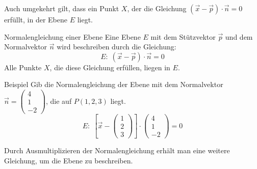 \documentclass{article}
\begin{document}
Auch umgekehrt gilt, dass ein Punkt $X$, der die Gleichung $\displaystyle \left(\vec{x} - \vec{p}\right)\cdot \vec{n} = 0$
erfüllt, in der Ebene $E$ liegt.
\begin{boxx}[Red]{Normalengleichung einer Ebene}
    Eine Ebene $E$ mit dem Stützvektor $\vec{p}$ und dem Normalvektor $\vec{n}$ wird beschreiben durch die Gleichung:
    \[E:\; \left(\vec{x} - \vec{p}\right)\cdot \vec{n} = 0\]
    Alle Punkte $X$, die diese Gleichung erfüllen, liegen in $E$.
\end{boxx}
\begin{boxx}[DarkBlue]{Beispiel}
    Gib die Normalengleichung der Ebene mit dem Normalvektor $\displaystyle \vec{n} = \begin{pmatrix}4\\1\\-2\end{pmatrix}$,
    die auf $P(1,2,3)$ liegt.
    \[E:\; \left[\vec{x} - \begin{pmatrix}1\\2\\3\end{pmatrix}\right]\cdot \begin{pmatrix}4\\1\\-2\end{pmatrix} = 0\]
\end{boxx}
Durch Ausmultiplizieren der Normalengleichung erhält man eine weitere Gleichung, um die Ebene zu beschreiben.
\end{document}
